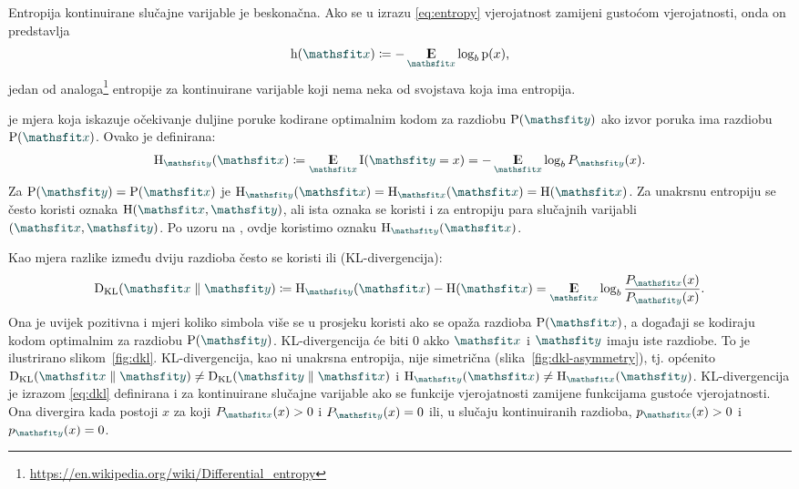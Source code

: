 \documentclass[utf8, diplomski, lmodern]{fer}
\begin{document}
Entropija kontinuirane slučajne varijable je beskonačna. Ako se u izrazu \eqref{eq:entropy} vjerojatnost zamijeni gustoćom vjerojatnosti, onda on predstavlja 
\begin{align}\label{eq:diff-entropy}
\h(\rvar x) \coloneqq -\E_{\rvar x}\log_b \p(x) \text{,}
\end{align}
jedan od analoga\footnote{\url{https://en.wikipedia.org/wiki/Differential_entropy}} entropije za kontinuirane varijable koji nema neka od svojstava koja ima entropija.

 je mjera koja iskazuje očekivanje duljine poruke kodirane optimalnim kodom za razdiobu $\P(\rvar y)$ ako izvor poruka ima razdiobu $\P(\rvar x)$. Ovako je definirana:
\begin{align}
\H_{\rvar y}(\rvar x)\coloneqq \E_{\rvar x}\I(\rvar y=x) = -\E_{\rvar x}\log_b P_{\rvar y}(x) \text{.}
\end{align}
Za $\P(\rvar y) = \P(\rvar x)$ je $\H_{\rvar y}(\rvar x) = \H_{\rvar x}(\rvar x)=\H(\rvar x)$. Za unakrsnu entropiju se često koristi oznaka $\H(\rvar x,\rvar y)$, ali ista oznaka se koristi i za entropiju para slučajnih varijabli $(\rvar x,\rvar y)$. Po uzoru na \citet{Olah:2015:VIT}, ovdje koristimo oznaku $\H_{\rvar y}(\rvar x)$.

Kao mjera razlike između dviju razdioba često se koristi  ili  (KL-divergencija):
\begin{align}
	\Dkl{\rvar x}{\rvar y} \coloneqq \H_{\rvar y}(\rvar x) - \H(\rvar x) = \E_{\rvar x} \log_b\frac{P_{\rvar x}(x)}{P_{\rvar y}(x)} \text{.}
	\label{eq:dkl}
\end{align}
Ona je uvijek pozitivna i mjeri koliko simbola više se u prosjeku koristi ako se opaža razdioba $\P(\rvar x)$, a događaji se kodiraju kodom optimalnim za razdiobu $\P(\rvar y)$. KL-divergencija će biti $0$ akko $\rvar x$ i $\rvar y$ imaju iste razdiobe. To je ilustrirano slikom~\ref{fig:dkl}. KL-divergencija, kao ni unakrsna entropija, nije simetrična (slika~\ref{fig:dkl-asymmetry}), tj. općenito $\Dkl{\rvar x}{\rvar y}\neq\Dkl{\rvar y}{\rvar x}$ i $\H_{\rvar y}(\rvar x)\neq\H_{\rvar x}(\rvar y)$. KL-divergencija je izrazom \eqref{eq:dkl} definirana i za kontinuirane slučajne varijable ako se funkcije vjerojatnosti zamijene funkcijama gustoće vjerojatnosti. Ona divergira kada postoji $x$ za koji $P_{\rvar x}(x)>0$ i $P_{\rvar y}(x)=0$ ili, u slučaju kontinuiranih razdioba, $p_{\rvar x}(x)>0$ i $p_{\rvar y}(x)=0$.
\end{document}
